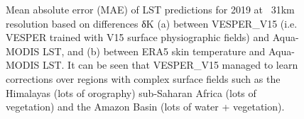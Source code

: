\documentclass[hess, twostagejnl]{copernicus}
\begin{document}
 
 
 \begin{figure}
 	 \hspace{1mm}
 	\caption{Mean absolute error (MAE) of LST predictions for 2019 at ~31km resolution based on differences δK (a) between VESPER\_V15 (i.e. VESPER trained with V15 surface physiographic fields) and Aqua-MODIS LST, and (b) between ERA5 skin temperature and Aqua-MODIS LST. It can be seen that VESPER\_V15 managed to learn corrections over regions with complex surface fields such as the Himalayas (lots of orography) sub-Saharan Africa (lots of vegetation) and the Amazon Basin (lots of water + vegetation). } 
 	\label{fig:example_model}
 \end{figure}
\end{document}
